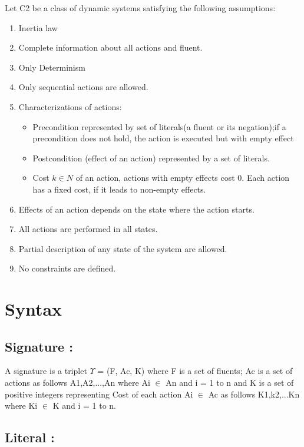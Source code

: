 \documentclass[11pt]{article}
\begin{document}
	Let C2 be a class of dynamic systems satisfying the following assumptions:
	\begin{enumerate}
		\item Inertia law
		\item Complete information about all actions and fluent. 
		\item Only Determinism
		\item Only sequential actions are allowed.
		\item Characterizations of actions:\begin{itemize}
			\item Precondition represented by set of literals(a fluent or its negation);if a precondition does not hold, the action is executed but with empty effect
			\item Postcondition (effect of an action) represented by a set of literals.
			\item Cost $k \in N $ of an action, actions with empty effects cost 0. Each action has a fixed cost, if it leads to non-empty effects. 
		\end{itemize}
		\item Effects of an action depends on the state where the action starts.
		\item All actions are performed in all states.
		\item Partial description of any state of the system are allowed.
		\item No constraints are defined.	 
	\end{enumerate}
	
	\section{Syntax}\label{sec:syntax}
	
	
	\subsection{Signature :}\label{sec:Signature} 

A signature is a triplet $\Upsilon$ = (F, Ac, K) where F is a set of fluents; Ac is a set of actions as follows A1,A2,...,An where Ai $\in$ An and i = 1 to n and K is a set of positive integers representing Cost of each action Ai $\in$ Ac as follows K1,k2,...Kn where Ki $\in$ K and i = 1 to n.

\subsection{Literal :}\label{sec:Literal} 
\end{document}

